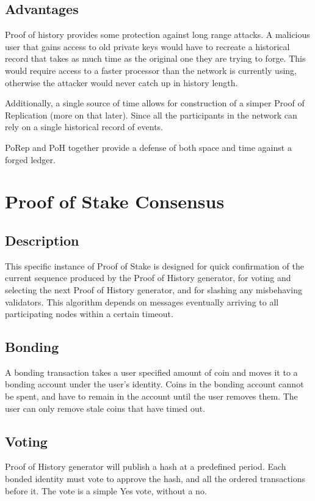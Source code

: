 \documentclass[12pt]{article}
\begin{document}
\subsection{Advantages}

Proof of history provides some protection against long range attacks.  A malicious user that gains access to old private keys would have to recreate a historical record that takes as much time as the original one they are trying to forge.  This would require access to a faster processor than the network is currently using, otherwise the attacker would never catch up in history length.

Additionally, a single source of time allows for construction of a simper Proof of Replication (more on that later).  Since all the participants in the network can rely on a single historical record of events.  

PoRep and PoH together provide a defense of both space and time against a forged ledger.

\section{Proof of Stake Consensus}
\subsection{Description}
This specific instance of Proof of Stake is designed for quick confirmation of the current sequence produced by the Proof of History generator, for voting and selecting the next Proof of History generator, and for slashing any misbehaving validators.  This algorithm depends on messages eventually arriving to all participating nodes within a certain timeout.
\subsection{Bonding}
A bonding transaction takes a user specified amount of coin and moves it to a bonding account under the user’s identity.  Coins in the bonding account cannot be spent, and have to remain in the account until the user removes them.  The user can only remove stale coins that have timed out. 
\subsection{Voting}
Proof of History generator will publish a hash at a predefined period.  Each bonded identity must vote to approve the hash, and all the ordered transactions before it.  The vote is a simple Yes vote, without a no.
\end{document}
